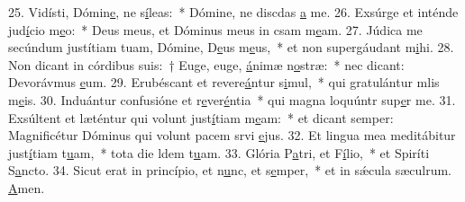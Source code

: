 25. Vidísti, Dómin\uline{e}, ne s\uline{í}leas:~* Dómine, ne discdas \uline{a} me.
26. Exsúrge et inténde jud\uline{í}cio m\uline{e}o:~* Deus meus, et Dóminus meus in csam m\uline{e}am.
27. Júdica me secúndum justítiam tuam, Dómine, D\uline{e}us m\uline{e}us,~* et non supergáudant m\uline{i}hi.
28. Non dicant in córdibus suis:~† Euge, euge, \uline{á}nimæ n\uline{o}stræ:~* nec dicant: Devorávmus \uline{e}um.
29. Erubéscant et revere\uline{á}ntur s\uline{i}mul,~* qui gratulántur mlis m\uline{e}is.
30. Induántur confusióne et r\uline{e}ver\uline{é}ntia~* qui magna loquúntr sup\uline{e}r me.
31. Exsúltent et læténtur qui volunt just\uline{í}tiam m\uline{e}am:~* et dicant semper: Magnificétur Dóminus qui volunt pacem srvi \uline{e}jus.
32. Et lingua mea meditábitur just\uline{í}tiam t\uline{u}am,~* tota die ldem t\uline{u}am.
33. Glória P\uline{a}tri, et F\uline{í}lio,~* et Spiríti S\uline{a}ncto.
34. Sicut erat in princípio, et n\uline{u}nc, et s\uline{e}mper,~* et in sǽcula sæculrum. \uline{A}men.
